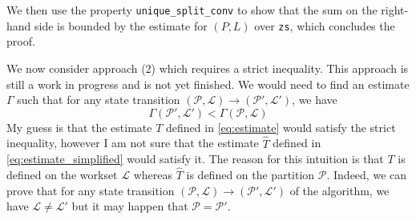 \documentclass[12pt, a4 paper]{article}
\theoremstyle{definition}
\begin{document}
We then use the property \texttt{unique\_split\_conv} to show that the sum on the right-hand side is bounded by the estimate for $(P, L)$ over \texttt{zs}, which concludes the proof.

\bigskip

We now consider approach (2) which requires a strict inequality.
This approach is still a work in progress and is not yet finished.
We would need to find an estimate $\Gamma$ such that for any state transition $(\mathcal{P}, \mathcal{L}) \rightarrow (\mathcal{P}', \mathcal{L}')$, we have
\begin{equation*}
    \Gamma(\mathcal{P}', \mathcal{L}') < \Gamma(\mathcal{P}, \mathcal{L})
\end{equation*}
My guess is that the estimate $T$ defined in \ref{eq:estimate} would satisfy the strict inequality, however I am not sure that the estimate $\hat{T}$ defined in \ref{eq:estimate_simplified} would satisfy it. The reason for this intuition is that $T$ is defined on the workset $\mathcal{L}$ whereas $\hat{T}$ is defined on the partition $\mathcal{P}$.
Indeed, we can prove that for any state transition $(\mathcal{P}, \mathcal{L}) \rightarrow (\mathcal{P}', \mathcal{L}')$ of the algorithm, we have $\mathcal{L} \neq \mathcal{L}'$ but it may happen that $\mathcal{P} = \mathcal{P}'$.
\end{document}
